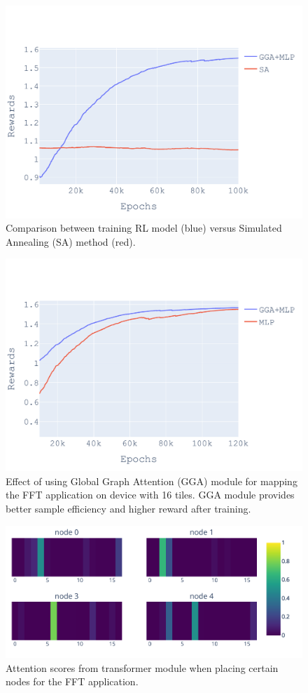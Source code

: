 \begin{figure}[tbh]
  \centering
  \includegraphics[width=0.75\linewidth]{fig/sa.pdf}
  \caption{Comparison between training RL model (blue) versus Simulated Annealing (SA) method (red).}
  \label{fig:ifft_sa}
\end{figure}

\begin{figure}[tbh]
  \centering
  \includegraphics[width=0.7\linewidth]{fig/plot_gnn_atten_ppo.pdf}
  \caption{Effect of using Global Graph Attention (GGA) module for mapping the FFT application on device with 16 tiles.
    GGA module provides better sample efficiency and higher reward after training. }
  \label{fig:ifft_rewards}
\end{figure}

\begin{figure}[tbh]
  \centering
  \includegraphics[width=0.7\linewidth]{fig/ifft_attention.pdf}
  \caption{Attention scores from transformer module when placing certain nodes for the FFT application. }
  \label{fig:ifft_attention}
\end{figure}


